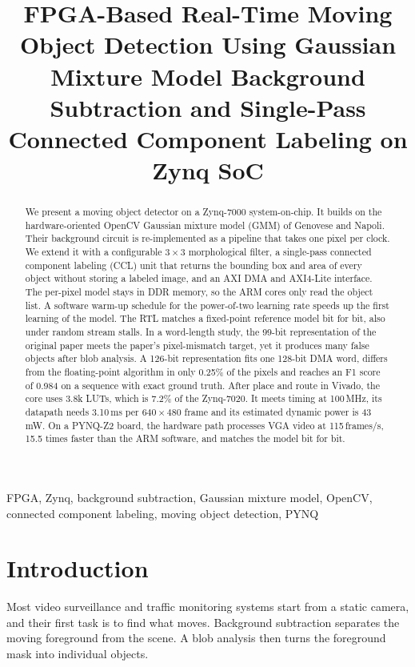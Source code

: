 \documentclass[conference]{IEEEtran}
\begin{document}
\title{FPGA-Based Real-Time Moving Object Detection Using Gaussian Mixture Model
Background Subtraction and Single-Pass Connected Component Labeling on Zynq SoC}

\maketitle

\begin{abstract}
We present a moving object detector on a Zynq-7000 system-on-chip. It builds on
the hardware-oriented OpenCV Gaussian mixture model (GMM) of Genovese and
Napoli. Their background circuit is re-implemented as a pipeline that takes one
pixel per clock. We extend it with a configurable $3\times3$ morphological
filter, a single-pass connected component labeling (CCL) unit that returns the
bounding box and area of every object without storing a labeled image, and an
AXI DMA and AXI4-Lite interface. The per-pixel model stays in DDR memory, so the
ARM cores only read the object list. A software warm-up schedule for the
power-of-two learning rate speeds up the first learning of the model. The RTL
matches a fixed-point reference model bit for bit, also under random stream
stalls. In a word-length study, the 99-bit representation of the
original paper meets the paper's pixel-mismatch target, yet it produces many
false objects after blob analysis. A 126-bit representation fits one 128-bit DMA
word, differs from the floating-point algorithm in only 0.25\% of the pixels and
reaches an F1 score of 0.984 on a sequence with exact ground truth. After place
and route in Vivado, the core uses 3.8k LUTs, which is 7.2\% of the Zynq-7020. It
meets timing at 100\,MHz, its datapath needs 3.10\,ms per $640\times480$ frame
and its estimated dynamic power is 43\,mW. On a PYNQ-Z2 board, the hardware path
processes VGA video at 115\,frames/s, 15.5 times faster than the ARM software,
and matches the model bit for bit.
\end{abstract}

\begin{IEEEkeywords}
FPGA, Zynq, background subtraction, Gaussian mixture model, OpenCV,
connected component labeling, moving object detection, PYNQ
\end{IEEEkeywords}

\section{Introduction}
Most video surveillance and traffic monitoring systems start from a static
camera, and their first task is to find what moves. Background subtraction
separates the moving foreground from the scene. A blob analysis then turns the
foreground mask into individual objects.
\end{document}
